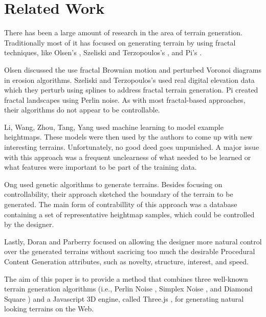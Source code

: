\section{Related Work} 
\label{sec:related_work}

There has been a large amount of research in the area of terrain generation. Traditionally most of it has focused on generating terrain by using fractal techniques, like Olsen's \cite{lechner:2006}, Szeliski and Terzopoulos's \cite{szeliski:1989}, and Pi's \cite{pi:2006}.

Olsen \cite{lechner:2006} discussed the use fractal Brownian motion and perturbed Voronoi diagrams in erosion algorithms. Szeliski and Terzopoulos's \cite{szeliski:1989} used real digital elevation data which they perturb using splines to address fractal terrain generation. Pi \cite{pi:2006} created fractal landscapes using Perlin noise. As with most fractal-based approaches, their algorithms do not appear to be controllable.

Li, Wang, Zhou, Tang, Yang \cite{li:2006} used machine learning to model example heightmaps. These models were then used by the authors to come up with new interesting terrains. Unfortunately, no good deed goes unpunished. A major issue with this approach was a frequent unclearness of what needed to be learned or what features were important to be part of the training data.

Ong \cite{ong:2005} used genetic algorithms to generate terrains. Besides focusing on controllability, their approach sketched the boundary of the terrain to be generated. The main form of contrabillity of this approach was a database containing a set of representative heightmap samples, which could be controlled by the designer.
  
Lastly, Doran and Parberry \cite{doran:2010} focused on allowing the designer more natural control over the generated terrains without sacricing too much the desirable Procedural Content Generation attributes, such as novelty, structure, interest, and speed.

The aim of this paper is to provide a method that combines three well-known terrain generation algorithms (i.e., Perlin Noise  \cite{perlin:2002}, Simplex Noise \cite{perlin:2001}, and Diamond Square \cite{fournier:1982}) and a Javascript 3D engine, called Three.js \cite{threeJS}, for generating natural looking terrains on the Web.

